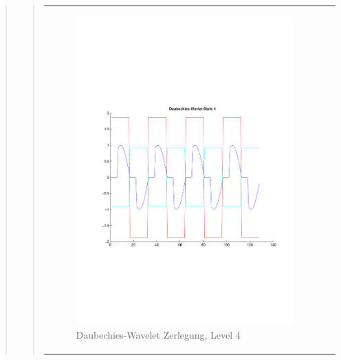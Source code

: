 \begin{quote}
\begin{quote}
\begin{center}
\begin{tabular}{ll}
\begin{minipage}{0.6\textwidth}
                    \end{minipage}
                    \begin{minipage}{0.6\textwidth}
    
                        \begin{figure}[H]
                            \label{fig:}
                            \includegraphics[scale=0.45, trim = 0.8cm 6cm 3cm
                            7.5cm,
                            clip]{./Bilder/Termin8/Daubechies_Wavlet_lvl_4}
                            \caption{Daubechies-Wavelet Zerlegung, Level 4}
                        \end{figure}
                    \vspace{-1.5em}
    
                    \end{minipage}
    

\end{tabular}
\end{center}
\end{quote}
\end{quote}
